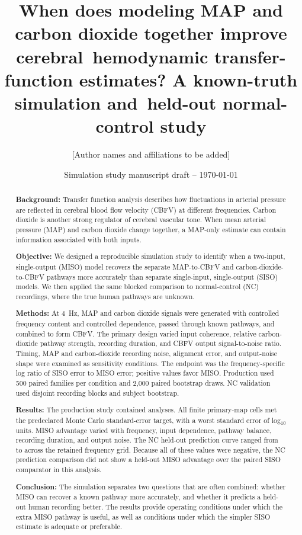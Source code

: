 \documentclass[12pt]{article}
\title{When does modeling MAP and carbon dioxide together improve cerebral\
hemodynamic transfer-function estimates? A known-truth simulation and\
held-out normal-control study}
\author{[Author names and affiliations to be added]}
\date{Simulation study manuscript draft -- \today}
\begin{document}
\maketitle

\begin{abstract}
\textbf{Background:} Transfer function analysis describes how fluctuations in
arterial pressure are reflected in cerebral blood flow velocity (CBFV) at
different frequencies. Carbon dioxide is another strong regulator of cerebral
vascular tone. When mean arterial pressure (MAP) and carbon dioxide change
together, a MAP-only estimate can contain information associated with both
inputs.

\textbf{Objective:} We designed a reproducible simulation study to identify
when a two-input, single-output (MISO) model recovers the separate MAP-to-CBFV
and carbon-dioxide-to-CBFV pathways more accurately than separate
single-input, single-output (SISO) models. We then applied the same blocked
comparison to normal-control (NC) recordings, where the true human pathways
are unknown.

\textbf{Methods:} At 4~Hz, MAP and carbon dioxide signals were generated with
controlled frequency content and controlled dependence, passed through known
pathways, and combined to form CBFV. The primary design varied input
coherence, relative carbon-dioxide pathway strength, recording duration, and
CBFV output signal-to-noise ratio. Timing, MAP and carbon-dioxide recording
noise, alignment error, and output-noise shape were examined as sensitivity
conditions. The endpoint was the frequency-specific log ratio of SISO error to
MISO error; positive values favor MISO. Production used 500 paired families per
condition and 2,000 paired bootstrap draws. NC validation used disjoint
recording blocks and subject bootstrap.

\textbf{Results:} The production study contained \SimulationTotalAnalyses{}
analyses. All finite primary-map cells met the predeclared Monte Carlo
standard-error target, with a worst standard error of
\MaximumMonteCarloSE{} log$_{10}$ units. MISO advantage varied with frequency,
input dependence, pathway balance, recording duration, and output noise. The
NC held-out prediction curve ranged from \NCAdvantageMinimum{} to
\NCAdvantageMaximum{} across the retained frequency grid. Because all of
these values were negative, the NC prediction comparison did not show a
held-out MISO advantage over the paired SISO comparator in this analysis.

\textbf{Conclusion:} The simulation separates two questions that are often
combined: whether MISO can recover a known pathway more accurately, and whether
it predicts a held-out human recording better. The results provide operating
conditions under which the extra MISO pathway is useful, as well as conditions
under which the simpler SISO estimate is adequate or preferable.
\end{abstract}
\end{document}
